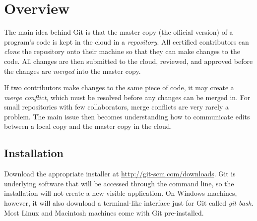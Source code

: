 \label{appendix:git}


\section*{Overview} %

The main idea behind Git is that the master copy (the official version) of a program's code is kept in the cloud in a \emph{repository}.
All certified contributors can \emph{clone} the repository onto their machine so that they can make changes to the code.
All changes are then submitted to the cloud, reviewed, and approved before the changes are \emph{merged} into the master copy.

If two contributors make changes to the same piece of code, it may create a \emph{merge conflict}, which must be resolved before any changes can be merged in.
For small repositories with few collaborators, merge conflicts are very rarely a problem.
The main issue then becomes understanding how to communicate edits between a local copy and the master copy in the cloud.

\subsection*{Installation} %

Download the appropriate installer at \url{http://git-scm.com/downloads}.
Git is underlying software that will be accessed through the command line, so the installation will not create a new visible application.
On Windows machines, however, it will also download a terminal-like interface just for Git called \emph{git bash}.
Most Linux and Macintosh machines come with Git pre-installed.

